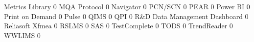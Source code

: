 \documentclass{article}
\begin{document}
\begin{Schunk}
\begin{Soutput}
  Metrics Library                                                          0
  MQA Protocol                                                             0
  Navigator                                                                0
  PCN/SCN                                                                  0
  PEAR                                                                     0
  Power BI                                                                 0
  Print on Demand                                                          0
  Pulse                                                                    0
  QIMS                                                                     0
  QPI                                                                      0
  R&D Data Management Dashboard                                            0
  Reliasoft Xfmea                                                          0
  RSLMS                                                                    0
  SAS                                                                      0
  TestComplete                                                             0
  TODS                                                                     0
  TrendReader                                                              0
  WWLIMS                                                                   0
                                                           

\end{Soutput}
\end{Schunk}
\end{document}
